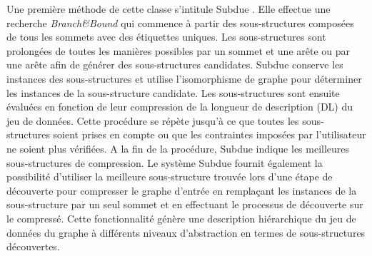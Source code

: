 Une première méthode de cette classe s'intitule Subdue \citep{ketkar2005subdue}. Elle effectue une recherche \textit{Branch\&Bound} qui commence à partir des sous-structures composées de tous les sommets avec des étiquettes uniques. Les sous-structures sont prolongées de toutes les manières possibles par un sommet et une arête ou par une arête afin de générer des sous-structures candidates. Subdue conserve les instances des sous-structures et utilise l'isomorphisme de graphe pour déterminer les instances de la sous-structure candidate. Les sous-structures sont ensuite évaluées en fonction de leur compression de la longueur de description (DL) du jeu de données. Cette procédure se répète jusqu'à ce que toutes les sous-structures soient prises en compte ou que les contraintes imposées par l'utilisateur ne soient plus vérifiées. A la fin de la procédure, Subdue indique les meilleures sous-structures de compression.
				Le système Subdue fournit également la possibilité d'utiliser la meilleure sous-structure trouvée lors d'une étape de découverte pour compresser le graphe d'entrée en remplaçant les instances de la sous-structure par un seul sommet et en effectuant le processus de découverte sur le  compressé. Cette fonctionnalité génère une description hiérarchique du jeu de données du graphe à différents niveaux d'abstraction en termes de sous-structures découvertes.